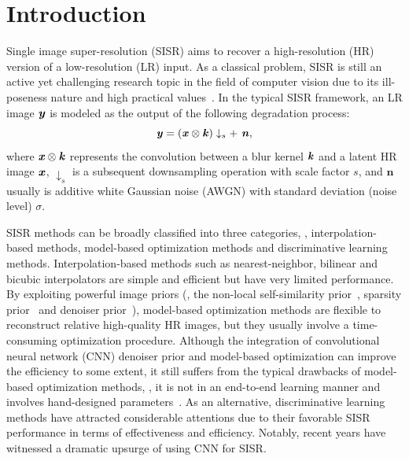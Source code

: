 \documentclass[10pt,twocolumn,letterpaper]{article}
\begin{document}
\section{Introduction}
Single image super-resolution (SISR) aims to recover a high-resolution (HR) version of a low-resolution (LR) input.
As a classical problem, SISR is still an active yet challenging research topic in the field of computer vision due to its ill-poseness nature and high practical values~\cite{baker2002limits}.
In the typical SISR framework, an LR image $\textbf{\emph{y}}$ is modeled as the output of the following degradation process:
\begin{equation}\label{eq1}
  \textbf{\emph{y}}=(\textbf{\emph{x}} \otimes \textbf{\emph{k}})\downarrow_s + ~ \textbf{\emph{n}},
\end{equation}
where $\textbf{\emph{x}} \otimes \textbf{\emph{k}}$ represents the convolution between a blur kernel $\textbf{\emph{k}}$ and a latent HR image $\textbf{\emph{x}}$,
$\downarrow_s$ is a subsequent downsampling operation with scale factor $s$, and $\boldsymbol{n}$ usually is additive white Gaussian noise (AWGN) with standard deviation (noise level) $\sigma$.


SISR methods can be broadly classified into three categories, \ie, interpolation-based methods, model-based optimization methods and discriminative learning methods. Interpolation-based methods such as nearest-neighbor, bilinear and bicubic interpolators are simple and efficient but have very limited performance.
By exploiting powerful image priors (\eg, the non-local self-similarity prior~\cite{mairal2009non,dong2013nonlocally}, sparsity prior~\cite{yang2010image} and denoiser prior~\cite{egiazarian2015single,zhang2017learning,bigdeli2017deep}), model-based optimization methods
are flexible to reconstruct relative high-quality HR images, but they usually involve a time-consuming optimization procedure. Although the integration of convolutional neural network (CNN) denoiser prior and model-based optimization can improve the efficiency to some extent,
it still suffers from the typical drawbacks of model-based optimization methods, \eg, it is not in an end-to-end learning manner and involves hand-designed parameters~\cite{zhang2017learning}.
As an alternative, discriminative learning methods have attracted considerable attentions due to
their favorable SISR performance in terms of effectiveness and efficiency.
Notably, recent years have witnessed a dramatic upsurge of using CNN for SISR.
\end{document}
